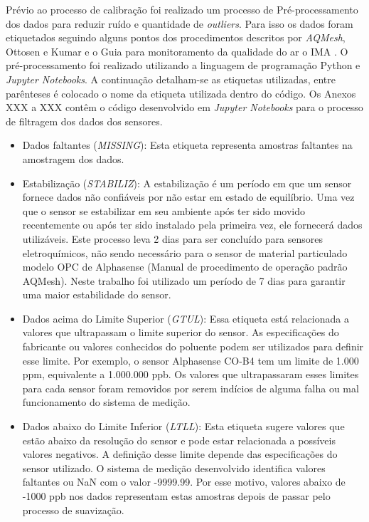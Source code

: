 Prévio ao processo de calibração foi realizado um processo de Pré-processamento dos dados para reduzir ruído e quantidade de \textit{outliers}. Para isso os dados foram etiquetados seguindo alguns pontos dos procedimentos descritos por \textit{AQMesh}, Ottosen e Kumar \cite{Ottosen2019OutlierMeasurements} e o Guia para monitoramento da qualidade do ar o IMA \cite*{INSTITUTODEENERGIAEMEIOAMBIENTE2019QualidadeAr}. O pré-processamento foi realizado utilizando a linguagem de programação Python e \textit{Jupyter Notebooks}. A continuação detalham-se as etiquetas utilizadas, entre parênteses é colocado o nome da etiqueta utilizada dentro do código. Os Anexos XXX a XXX contêm o código desenvolvido em \textit{Jupyter Notebooks} para o processo de filtragem dos dados dos sensores.

\begin{itemize}
    \item Dados faltantes (\textit{MISSING}): Esta etiqueta representa amostras faltantes na amostragem dos dados.
    \item Estabilização (\textit{STABILIZ}): A estabilização é um período em que um sensor fornece dados não confiáveis por não estar em estado de equilíbrio. Uma vez que o sensor se estabilizar em seu ambiente após ter sido movido recentemente ou após ter sido instalado pela primeira vez, ele fornecerá dados utilizáveis. Este processo leva 2 dias para ser concluído para sensores eletroquímicos, não sendo necessário para o sensor de material particulado modelo OPC de Alphasense (Manual de procedimento de operação padrão AQMesh). Neste trabalho foi utilizado um período de 7 dias para garantir uma maior estabilidade do sensor.
    \item Dados acima do Limite Superior (\textit{GTUL}): Essa etiqueta está relacionada a valores que ultrapassam o limite superior do sensor. As especificações do fabricante ou valores conhecidos do poluente podem ser utilizados para definir esse limite. Por exemplo, o sensor Alphasense CO-B4 tem um limite de 1.000 ppm, equivalente a 1.000.000 ppb. Os valores que ultrapassaram esses limites para cada sensor foram removidos por serem indícios de alguma falha ou mal funcionamento do sistema de medição.
    \item Dados abaixo do Limite Inferior (\textit{LTLL}): Esta etiqueta sugere valores que estão abaixo da resolução do sensor e pode estar relacionada a possíveis valores negativos. A definição desse limite depende das especificações do sensor utilizado. O sistema de medição desenvolvido identifica valores faltantes ou NaN com o valor -9999.99. Por esse motivo, valores abaixo de -1000 ppb nos dados representam estas amostras depois de passar pelo processo de suavização.

\end{itemize}
